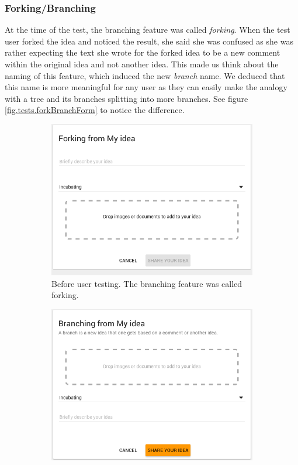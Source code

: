 \documentclass[a4paper,12pt,twoside]{article}
\begin{document}
\subsubsection*{Forking/Branching}
At the time of the test, the branching feature was called \emph{forking}.
When the test user forked the idea and noticed the result, she said she was confused as she was rather expecting the text she wrote for the forked idea to be a new comment within the original idea and not another idea.
This made us think about the naming of this feature, which induced the new \emph{branch} name.
We deduced that this name is more meaningful for any user as they can easily make the analogy with a tree and its branches splitting into more branches.
See figure \ref{fig.tests.forkBranchForm} to notice the difference.

\begin{figure}[!htb]
    \begin{subfigure}[t]{.495\textwidth}
        \includegraphics[width=\textwidth]{images/user_tests/forkBranchForm_before.png}
        \caption{Before user testing. The branching feature was called forking.}
        \label{fig.tests.forkBranchForm.before}
    \end{subfigure}
    \hfill
    \begin{subfigure}[t]{.495\textwidth}
        \includegraphics[width=\textwidth]{images/user_tests/forkBranchForm_after.png}

\end{subfigure}
\end{figure}
\end{document}
